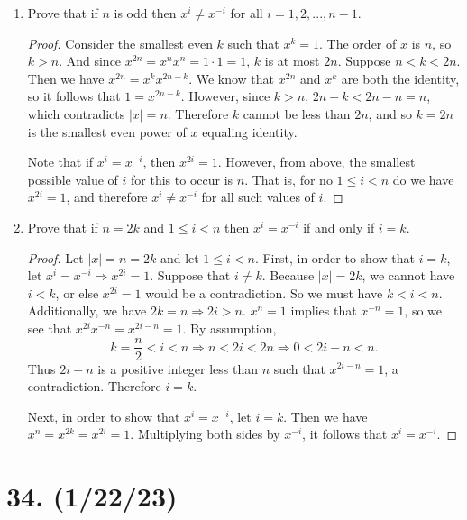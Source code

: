 \documentclass{article}
\begin{document}
\begin{enumerate}[label=(\alph*)]
      \item Prove that if $n$ is odd then $x^i \neq x^{-i}$ for all $i = 1, 2, ..., n - 1$.
            \begin{proof}
                  Consider the smallest even $k$ such that $x^k = 1$. The order of $x$ is $n$, so $k > n$. And since $x^{2n} = x^n x^n = 1 \cdot 1 = 1$, $k$ is at most $2n$. Suppose $n < k < 2n$. Then we have $x^{2n} = x^k x^{2n - k}$. We know that $x^{2n}$ and $x^k$ are both the identity, so it follows that $1 = x^{2n - k}$. However, since $k > n$, $2n - k < 2n - n = n$, which contradicts $|x| = n$. Therefore $k$ cannot be less than $2n$, and so $k = 2n$ is the smallest even power of $x$ equaling identity.

                  Note that if $x^i = x^{-i}$, then $x^{2i} = 1$. However, from above, the smallest possible value of $i$ for this to occur is $n$. That is, for no $1 \leq i < n$ do we have $x^{2i} = 1$, and therefore $x^i \neq x^{-i}$ for all such values of $i$.
            \end{proof}
      \item Prove that if $n = 2k$ and $1 \leq i < n$ then $x^i = x^{-i}$ if and only if $i = k$.
            \begin{proof}
                  Let $|x| = n = 2k$ and let $1 \leq i < n$. First, in order to show that $i = k$, let $x^i = x^{-i} \Rightarrow x^{2i} = 1$. Suppose that $i \neq k$. Because $|x| = 2k$, we cannot have $i < k$, or else $x^{2i} = 1$ would be a contradiction. So we must have $k < i < n$. Additionally, we have $2k = n \Rightarrow 2i > n$. $x^n = 1$ implies that $x^{-n} = 1$, so we see that $x^{2i} x^{-n} = x^{2i - n} = 1$. By assumption,
                  \begin{equation*}
                        k = \frac{n}{2} < i < n \Rightarrow n < 2i < 2n \Rightarrow 0 < 2i - n < n.
                  \end{equation*}
                  Thus $2i - n$ is a positive integer less than $n$ such that $x^{2i - n} = 1$, a contradiction. Therefore $i = k$.

                  Next, in order to show that $x^i = x^{-i}$, let $i = k$. Then we have $x^n = x^{2k} = x^{2i} = 1$. Multiplying both sides by $x^{-i}$, it follows that $x^i = x^{-i}$.
            \end{proof}
\end{enumerate}

\section*{34. (1/22/23)}
\end{document}
